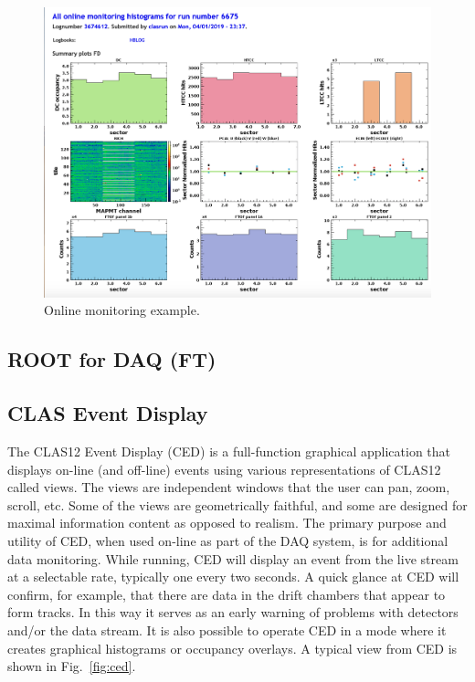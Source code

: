 \begin{figure}[hbt]
	\centering
	\includegraphics[width=1.0\columnwidth,keepaspectratio]{img/online_monitor.png}
	\caption{Online monitoring example.}
	\label{fig:online_monitor}
\end{figure}

\subsection{ROOT for DAQ (FT)}




\subsection{CLAS Event Display}

The CLAS12 Event Display (CED) is a full-function graphical application that displays on-line (and off-line) events using various representations of CLAS12 called views. The views are independent windows that the user can pan, zoom, scroll, etc. Some of the views are geometrically faithful, and some are designed for maximal information content as opposed to realism. The primary purpose and utility of CED, when used on-line as part of the DAQ system, is for additional data monitoring. While running, CED will display an event from the live stream at a selectable rate, typically one every two seconds. A quick glance at CED will confirm, for example, that there are data in the drift chambers that appear to form tracks. In this way it serves as an early warning of problems with detectors and/or the data stream. It is also possible to operate CED in a mode where it creates graphical histograms or occupancy overlays. A typical view from CED is shown in Fig.~\ref{fig:ced}.

